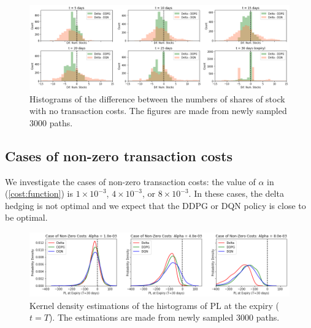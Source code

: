 \documentclass[11pt]{article}
\begin{document}
\begin{figure}[tb]
	\begin{center}
		\includegraphics[width=15cm]{../fig/fig04.png}
		\caption{Histograms of the difference between the numbers of shares of stock with no transaction costs. The figures are made from newly sampled 3000 paths.}
		\label{fig04}
	\end{center}
\end{figure}

\subsection{Cases of non-zero transaction costs}

We investigate the cases of non-zero transaction costs: the value of $\alpha$ in (\ref{cost:function}) is $1 \times 10^{-3}$, $4 \times 10^{-3}$, or $8 \times 10^{-3}$. In these cases, the delta hedging is not optimal and we expect that the DDPG or DQN policy is close to be optimal.

\begin{figure}[htb]
	\begin{center}
		\includegraphics[width=15cm]{../fig/fig05.png}
		\caption{Kernel density estimations of the histograms of PL at the expiry ($t=T$). The estimations are made from newly sampled 3000 paths.}
		\label{fig05}
	\end{center}
\end{figure}
\end{document}
